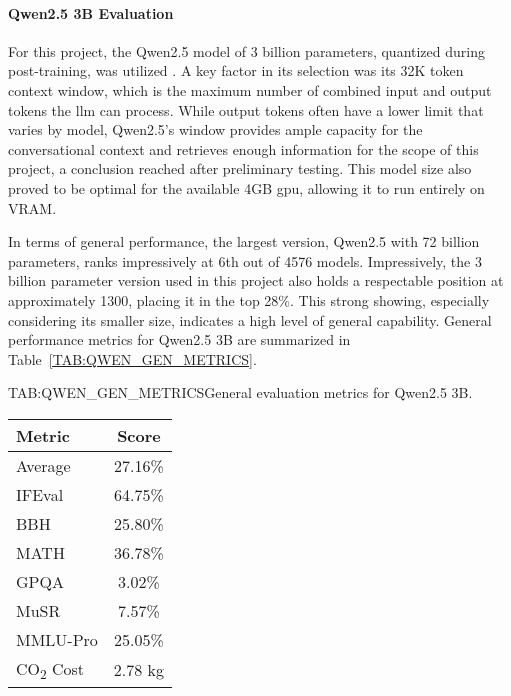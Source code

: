 \paragraph{Qwen2.5 3B Evaluation}

For this project, the Qwen2.5 model of 3 billion parameters, quantized during post-training, was utilized \cite{QWEN}. A key factor in its selection was its 32K token context window, which is the maximum number of combined input and output tokens the \ac{llm} can process. While output tokens often have a lower limit that varies by model, Qwen2.5's window provides ample capacity for the conversational context and retrieves enough information for the scope of this project, a conclusion reached after preliminary testing. This model size also proved to be optimal for the available 4GB \ac{gpu}, allowing it to run entirely on VRAM.

In terms of general performance, the largest version, Qwen2.5 with 72 billion parameters, ranks impressively at 6th out of 4576 models. Impressively, the 3 billion parameter version used in this project also holds a respectable position at approximately 1300, placing it in the top 28\%. This strong showing, especially considering its smaller size, indicates a high level of general capability. General performance metrics for Qwen2.5 3B are summarized in Table~\ref{TAB:QWEN_GEN_METRICS}.
\begin{table}[General Evaluation Metrics for Qwen2.5 3B]{TAB:QWEN_GEN_METRICS}{General evaluation metrics for Qwen2.5 3B.}
    \begin{tabular}{l c}
        \hline
        \textbf{Metric} & \textbf{Score} \\
        \hline
        Average & 27.16\% \\
        IFEval & 64.75\% \\
        BBH & 25.80\% \\
        MATH & 36.78\% \\
        GPQA & 3.02\% \\
        MuSR & 7.57\% \\
        MMLU-Pro & 25.05\% \\
        CO\textsubscript{2} Cost & 2.78 kg \\
        \hline
    \end{tabular}
\end{table}

